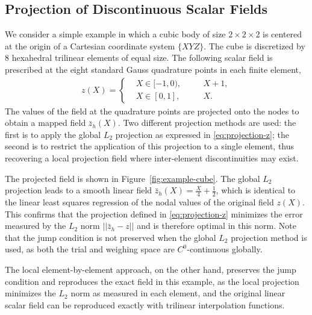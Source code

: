 \documentclass[12pt]{article}
\begin{document}
\subsection{Projection of Discontinuous Scalar Fields}

We consider a simple example in which a cubic body of size $2 \times 2 \times 2$
is centered at the origin of a Cartesian coordinate system $\{XYZ\}$. The cube
is discretized by 8 hexahedral trilinear elements of equal size. The following
scalar field is prescribed at the eight standard Gauss quadrature points in each
finite element,
\begin{align}
  z(X) =
  \left\{
    \begin{aligned}
      & X \in [-1, 0), & \quad & X + 1,
      \\
      & X \in [0, 1], & \quad & X.
    \end{aligned}
  \right. \label{eq:prescribed-scalar}
\end{align}
The values of the field at the quadrature points are projected onto
the nodes to obtain a mapped field $\bar{z}_{h}(X)$. Two different
projection methods are used: the first is to apply the global $L_2$
projection as expressed in \eqref{eq:projection-z}; the second is to
restrict the application of this projection to a single element, thus
recovering a local projection field where inter-element
discontinuities may exist.

The projected field is shown in Figure~\ref{fig:example-cube}. The global $L_2$
projection leads to a smooth linear field $\bar{z}_{h}(X) = \frac{X}{4} +
\frac{1}{2}$, which is identical to the linear least squares regression of the
nodal values of the original field $z(X)$. This confirms that the projection
defined in \eqref{eq:projection-z} minimizes the error measured by the $L_2$
norm $||\bar{z}_{h} - z||$ and is therefore optimal in this norm. Note that the
jump condition is not preserved when the global $L_2$ projection method is used,
as both the trial and weighing space are $C^{0}$-continuous globally.
 
The local element-by-element approach, on the other hand, preserves the jump
condition and reproduces the exact field in this example, as the local
projection minimizes the $L_2$ norm as measured in each element, and the
original linear scalar field can be reproduced exactly with trilinear
interpolation functions.
\end{document}

